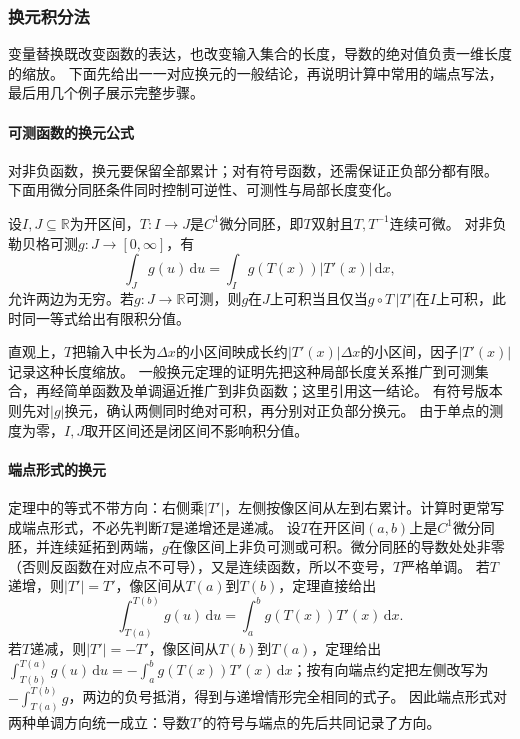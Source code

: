 \subsubsection{换元积分法}
\label{sec:analysis-coordinate-change-integral-applications}

变量替换既改变函数的表达，也改变输入集合的长度，导数的绝对值负责一维长度的缩放。
下面先给出一一对应换元的一般结论，再说明计算中常用的端点写法，最后用几个例子展示完整步骤。

\paragraph{可测函数的换元公式}
对非负函数，换元要保留全部累计；对有符号函数，还需保证正负部分都有限。
下面用微分同胚条件同时控制可逆性、可测性与局部长度变化。
\begin{theorem}[一维勒贝格积分的换元公式]
\label{thm:analysis-lebesgue-change-variables}
设$I,J\subseteq\mathbb R$为开区间，$T:I\to J$是$C^1$微分同胚，即$T$双射且$T,T^{-1}$连续可微。
对非负勒贝格可测$g:J\to[0,\infty]$，有
\[
 \int_Jg(u)\,\mathrm du=\int_Ig(T(x))|T'(x)|\,\mathrm dx,
\]
允许两边为无穷。若$g:J\to\mathbb R$可测，则$g$在$J$上可积当且仅当$g\circ T\,|T'|$在$I$上可积，此时同一等式给出有限积分值。
\end{theorem}
直观上，$T$把输入中长为$\Delta x$的小区间映成长约$|T'(x)|\Delta x$的小区间，因子$|T'(x)|$记录这种长度缩放。
一般换元定理的证明先把这种局部长度关系推广到可测集合，再经简单函数及单调逼近推广到非负函数；这里引用这一结论。
有符号版本则先对$|g|$换元，确认两侧同时绝对可积，再分别对正负部分换元。
由于单点的测度为零，$I,J$取开区间还是闭区间不影响积分值。

\paragraph{端点形式的换元}
定理中的等式不带方向：右侧乘$|T'|$，左侧按像区间从左到右累计。计算时更常写成端点形式，不必先判断$T$是递增还是递减。
设$T$在开区间$(a,b)$上是$C^1$微分同胚，并连续延拓到两端，$g$在像区间上非负可测或可积。微分同胚的导数处处非零（否则反函数在对应点不可导），又是连续函数，所以不变号，$T$严格单调。
若$T$递增，则$|T'|=T'$，像区间从$T(a)$到$T(b)$，定理直接给出
\[
 \int_{T(a)}^{T(b)}g(u)\,\mathrm du=\int_a^bg(T(x))T'(x)\,\mathrm dx.
\]
若$T$递减，则$|T'|=-T'$，像区间从$T(b)$到$T(a)$，定理给出$\int_{T(b)}^{T(a)}g(u)\,\mathrm du=-\int_a^bg(T(x))T'(x)\,\mathrm dx$；按有向端点约定把左侧改写为$-\int_{T(a)}^{T(b)}g$，两边的负号抵消，得到与递增情形完全相同的式子。
因此端点形式对两种单调方向统一成立：导数$T'$的符号与端点的先后共同记录了方向。

